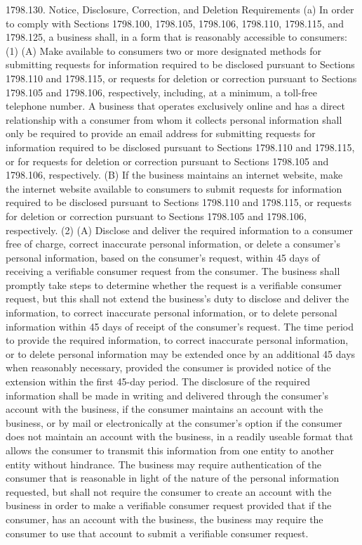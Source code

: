 1798.130.  Notice, Disclosure, Correction, and Deletion Requirements
(a) In order to comply with Sections 1798.100, 1798.105, 1798.106, 1798.110, 1798.115, and 1798.125, a business shall, in a form that is reasonably accessible to consumers:
(1) (A) Make available to consumers two or more designated methods for submitting requests for information required to be disclosed pursuant to Sections 1798.110 and 1798.115, or requests for deletion or correction pursuant to Sections 1798.105 and 1798.106, respectively, including, at a minimum, a toll-free telephone number. A business that operates exclusively online and has a direct relationship with a consumer from whom it collects personal information shall only be required to provide an email address for submitting requests for information required to be disclosed pursuant to Sections 1798.110 and 1798.115, or for requests for deletion or correction pursuant to Sections 1798.105 and 1798.106, respectively.
(B) If the business maintains an internet website, make the internet website available to consumers to submit requests for information required to be disclosed pursuant to Sections 1798.110 and 1798.115, or requests for deletion or correction pursuant to Sections 1798.105 and 1798.106, respectively.
(2) (A) Disclose and deliver the required information to a consumer free of charge, correct inaccurate personal information, or delete a consumer’s personal information, based on the consumer’s request, within 45 days of receiving a verifiable consumer request from the consumer. The business shall promptly take steps to determine whether the request is a verifiable consumer request, but this shall not extend the business’s duty to disclose and deliver the information, to correct inaccurate personal information, or to delete personal information within 45 days of receipt of the consumer’s request. The time period to provide the required information, to correct inaccurate personal information, or to delete personal information may be extended once by an additional 45 days when reasonably necessary, provided the consumer is provided notice of the extension within the first 45-day period. The disclosure of the required information shall be made in writing and delivered through the consumer’s account with the business, if the consumer maintains an account with the business, or by mail or electronically at the consumer’s option if the consumer does not maintain an account with the business, in a readily useable format that allows the consumer to transmit this information from one entity to another entity without hindrance. The business may require authentication of the consumer that is reasonable in light of the nature of the personal information requested, but shall not require the consumer to create an account with the business in order to make a verifiable consumer request provided that if the consumer, has an account with the business, the business may require the consumer to use that account to submit a verifiable consumer request.

